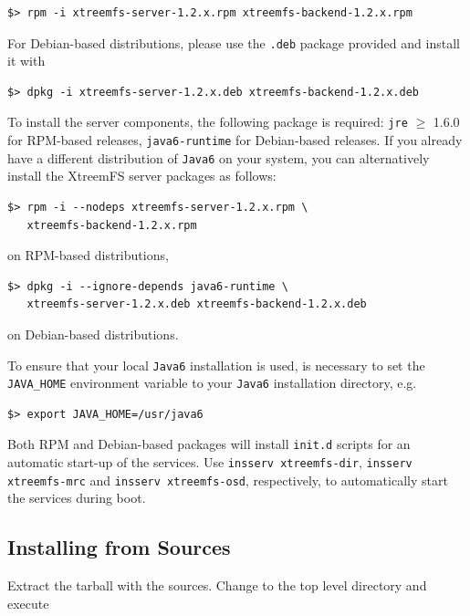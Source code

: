 \documentclass[a4paper,10pt]{book}
\begin{document}
\begin{verbatim}
$> rpm -i xtreemfs-server-1.2.x.rpm xtreemfs-backend-1.2.x.rpm
\end{verbatim}


For Debian-based distributions, please use the \texttt{.deb} package provided and install it with

\begin{verbatim}
$> dpkg -i xtreemfs-server-1.2.x.deb xtreemfs-backend-1.2.x.deb
\end{verbatim}


To install the server components, the following package is required: \texttt{jre} $\geq$ 1.6.0 for RPM-based releases, \texttt{java6-runtime} for Debian-based releases. If you already have a different distribution of \texttt{Java6} on your system, you can alternatively install the XtreemFS server packages as follows:

\begin{verbatim}
$> rpm -i --nodeps xtreemfs-server-1.2.x.rpm \
   xtreemfs-backend-1.2.x.rpm
\end{verbatim}

on RPM-based distributions,

\begin{verbatim}
$> dpkg -i --ignore-depends java6-runtime \
   xtreemfs-server-1.2.x.deb xtreemfs-backend-1.2.x.deb
\end{verbatim}

on Debian-based distributions.

To ensure that your local \texttt{Java6} installation is used, is necessary to set the \texttt{JAVA\_HOME} environment variable to your \texttt{Java6} installation directory, e.g.\

\begin{verbatim}
$> export JAVA_HOME=/usr/java6
\end{verbatim}


Both RPM and Debian-based packages will install \texttt{init.d} scripts for an automatic start-up of the services. Use \texttt{insserv xtreemfs-dir}, \texttt{insserv xtreemfs-mrc} and \texttt{insserv xtreemfs-osd}, respectively, to automatically start the services during boot.

\subsection{Installing from Sources}

Extract the tarball with the sources. Change to the top level directory and execute
\end{document}
